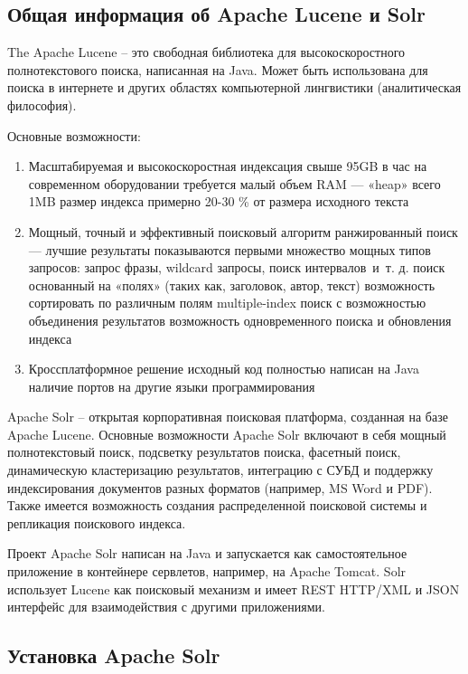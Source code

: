 \subsection{Общая информация об Apache Lucene и Solr}

The Apache Lucene -- это свободная библиотека для высокоскоростного полнотекстового поиска, написанная на Java. Может быть использована для поиска в интернете и других областях компьютерной лингвистики (аналитическая философия).

Основные возможности:

\begin{enumerate}
 \item Масштабируемая и высокоскоростная индексация
  \subitem свыше 95GB в час на современном оборудовании 
  \subitem требуется малый объем RAM — «heap» всего 1MB 
  \subitem размер индекса примерно 20-30 \% от размера исходного текста
 \item Мощный, точный и эффективный поисковый алгоритм
  \subitem ранжированный поиск — лучшие результаты показываются первыми
  \subitem множество мощных типов запросов: запрос фразы, wildcard запросы, поиск интервалов~и~т. д.
  \subitem поиск основанный на «полях» (таких как, заголовок, автор, текст)
  \subitem возможность сортировать по различным полям
  \subitem multiple-index поиск с возможностью объединения результатов
  \subitem возможность одновременного поиска и обновления индекса
 \item Кроссплатформное решение
  \subitem исходный код полностью написан на Java
  \subitem наличие портов на другие языки программирования
\end{enumerate}

Apache Solr – открытая корпоративная поисковая платформа, созданная на базе Apache Lucene. Основные возможности Apache Solr включают в себя мощный полнотекстовый поиск, подсветку результатов поиска, фасетный поиск, динамическую кластеризацию результатов, интеграцию с СУБД и поддержку индексирования документов разных форматов (например, MS Word и PDF). Также имеется возможность создания распределенной поисковой системы и репликация поискового индекса. 

Проект Apache Solr написан на Java  и запускается как самостоятельное приложение в контейнере сервлетов, например, на Apache Tomcat. Solr использует Lucene как поисковый механизм и имеет REST HTTP/XML и JSON интерфейс для взаимодействия с другими приложениями. 

\subsection{Установка Apache Solr}

